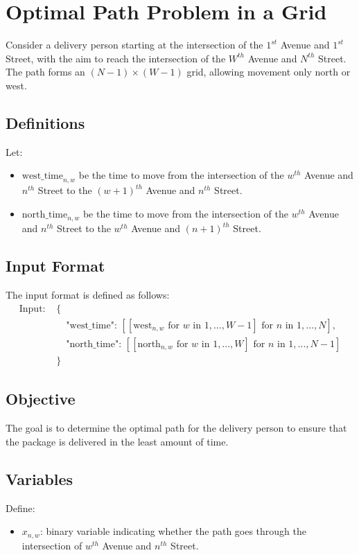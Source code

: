 \documentclass{article}
\begin{document}
\section*{Optimal Path Problem in a Grid}

Consider a delivery person starting at the intersection of the \(1^{st}\) Avenue and \(1^{st}\) Street, with the aim to reach the intersection of the \(W^{th}\) Avenue and \(N^{th}\) Street. The path forms an \((N-1) \times (W-1)\) grid, allowing movement only north or west.

\subsection*{Definitions}
Let:
\begin{itemize}
    \item \( \text{west\_time}_{n,w} \) be the time to move from the intersection of the \(w^{th}\) Avenue and \(n^{th}\) Street to the \( (w+1)^{th} \) Avenue and \(n^{th}\) Street.
    \item \( \text{north\_time}_{n,w} \) be the time to move from the intersection of the \(w^{th}\) Avenue and \(n^{th}\) Street to the \(w^{th}\) Avenue and \( (n+1)^{th} \) Street.
\end{itemize}

\subsection*{Input Format}
The input format is defined as follows:
\[
\begin{aligned}
    \text{Input: } & \{ \\
    & \quad \text{"west\_time": } [[\text{west}_{n,w} \text{ for } w \text{ in } 1, ..., W-1] \text{ for } n \text{ in } 1, ..., N], \\
    & \quad \text{"north\_time": } [[\text{north}_{n,w} \text{ for } w \text{ in } 1, ..., W] \text{ for } n \text{ in } 1, ..., N-1] \\
    & \}
\end{aligned}
\]

\subsection*{Objective}
The goal is to determine the optimal path for the delivery person to ensure that the package is delivered in the least amount of time. 

\subsection*{Variables}
Define:
\begin{itemize}
    \item \( x_{n,w} \): binary variable indicating whether the path goes through the intersection of \(w^{th}\) Avenue and \(n^{th}\) Street.
\end{itemize}
\end{document}
